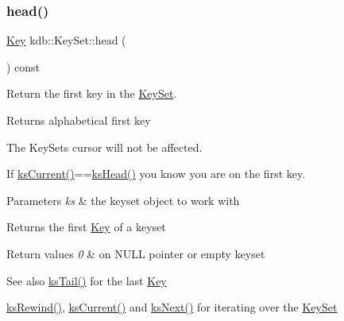 \subsubsection{\texorpdfstring{head()}{head()}}
{\footnotesize\ttfamily \hyperlink{classkdb_1_1Key}{Key} kdb\+::\+Key\+Set\+::head (\begin{DoxyParamCaption}{ }\end{DoxyParamCaption}) const\hspace{0.3cm}{\ttfamily [inline]}}



Return the first key in the \hyperlink{classkdb_1_1KeySet}{Key\+Set}. 

\begin{DoxyReturn}{Returns}
alphabetical first key
\end{DoxyReturn}
The Key\+Sets cursor will not be affected.

If \hyperlink{group__keyset_ga4287b9416912c5f2ab9c195cb74fb094}{ks\+Current()}==\hyperlink{group__keyset_gae7dbf3aef70e67b5328475eb3d1f92f5}{ks\+Head()} you know you are on the first key.


\begin{DoxyParams}{Parameters}
{\em ks} & the keyset object to work with \\
\hline
\end{DoxyParams}
\begin{DoxyReturn}{Returns}
the first \hyperlink{classkdb_1_1Key}{Key} of a keyset 
\end{DoxyReturn}

\begin{DoxyRetVals}{Return values}
{\em 0} & on N\+U\+LL pointer or empty keyset \\
\hline
\end{DoxyRetVals}
\begin{DoxySeeAlso}{See also}
\hyperlink{group__keyset_gadca442c4ab43cf532b15091d7711559e}{ks\+Tail()} for the last \hyperlink{group__key}{Key} 

\hyperlink{group__keyset_gabe793ff51f1728e3429c84a8a9086b70}{ks\+Rewind()}, \hyperlink{group__keyset_ga4287b9416912c5f2ab9c195cb74fb094}{ks\+Current()} and \hyperlink{group__keyset_ga317321c9065b5a4b3e33fe1c399bcec9}{ks\+Next()} for iterating over the \hyperlink{group__keyset}{Key\+Set} 
\end{DoxySeeAlso}
\mbox{\label{classkdb_1_1KeySet_a78125fb19c6aebb0d8fc1a7238b78ace}} 
